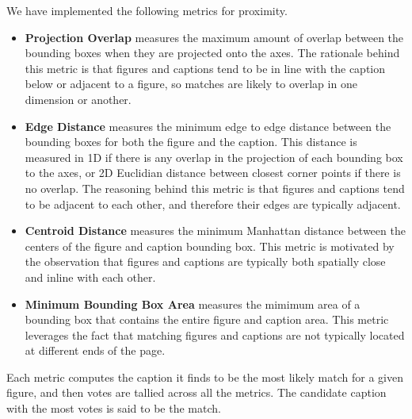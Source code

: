 \documentclass{article}
\begin{document}
We have implemented the following metrics for proximity.

\renewcommand{\labelitemi}{\textendash}
\begin{itemize}
\item \textbf{Projection Overlap} measures the maximum amount of overlap between the bounding boxes when they are projected onto the axes. The rationale behind this metric is that figures and captions tend to be in line with the caption below or adjacent to a figure, so matches are likely to overlap in one dimension or another.
\item  \textbf{Edge Distance} measures the minimum edge to edge distance between the bounding boxes for both the figure and the caption. This distance is measured in 1D if there is any overlap in the projection of each bounding box to the axes, or 2D Euclidian distance between closest corner points if there is no overlap. The reasoning behind this metric is that figures and captions tend to be adjacent to each other, and therefore their edges are typically adjacent.
\item  \textbf{Centroid Distance} measures the minimum Manhattan distance between the centers of the figure and caption bounding box. This metric is motivated by the observation that figures and captions are typically both spatially close and inline with each other.
\item  \textbf{Minimum Bounding Box Area} measures the mimimum area of a bounding box that contains the entire figure and caption area. This metric leverages the fact that matching figures and captions are not typically located at different ends of the page.

\end{itemize}
Each metric computes the caption it finds to be the most likely match for a given figure, and then votes are tallied across all the metrics. The candidate caption with the most votes is said to be the match.
\end{document}
